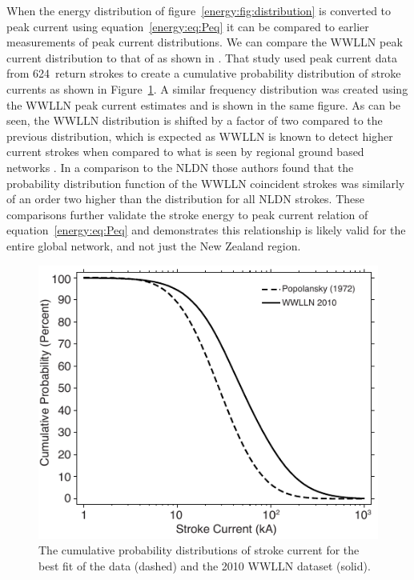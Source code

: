 When the energy distribution of figure~\ref{energy:fig:distribution} is converted to peak current using equation~\ref{energy:eq:Peq} it can be compared to earlier measurements of peak current distributions.
We can compare the WWLLN peak current distribution to that of \citet{Popolansky1972} as shown in \citet{Golde1977}.
That study used peak current data from 624~return strokes to create a cumulative probability distribution of stroke currents as shown in Figure~\ref{energy:fig:PPS_CDF}.
A similar frequency distribution was created using the WWLLN peak current estimates and is shown in the same figure.
As can be seen, the WWLLN distribution is shifted by a factor of two compared to the previous distribution, which is expected as WWLLN is known to detect higher current strokes when compared to what is seen by regional ground based networks \citep{Abarca2010}.
In a comparison to the NLDN those authors found that the probability distribution function of the WWLLN coincident strokes was similarly of an order two higher than the distribution for all NLDN strokes.
These comparisons further validate the stroke energy to peak current relation of equation~\ref{energy:eq:Peq} and demonstrates this relationship is likely valid for the entire global network, and not just the New Zealand region.

\begin{figure}[ht!]
\centering
\includegraphics[scale=1]{energy/Figures/PPS_CDF.pdf}
\caption{The cumulative probability distributions of stroke current for the best fit of the \citet{Popolansky1972} data (dashed) and the 2010 WWLLN dataset (solid).}
\label{energy:fig:PPS_CDF}
\end{figure}

